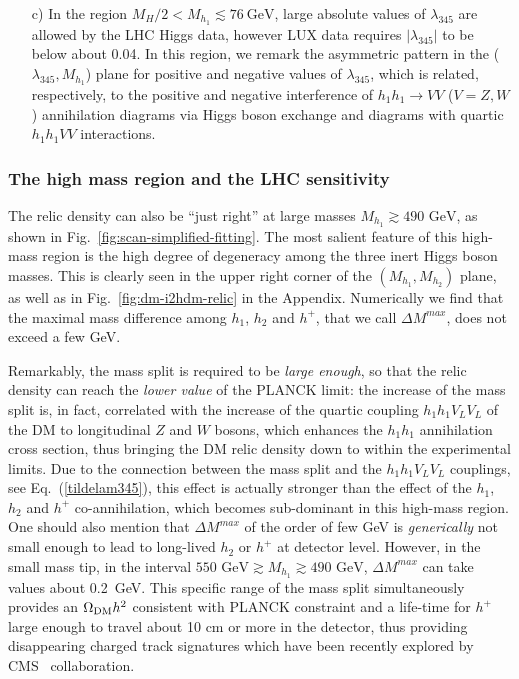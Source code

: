 \documentclass[12pt,a4paper]{article}
\begin{document}
\begin{itemize}
\item[c)] In the region $M_H/2<  M_{h_1} \lesssim 76~\mbox{GeV}$,  
large absolute values of  $\lambda_{345}$ are allowed by the LHC Higgs data, however LUX data requires $|\lambda_{345}|$ to be below about 0.04.
In this region, we remark the asymmetric pattern in the ($\lambda_{345},M_{h_1}$) plane
for positive and negative values of $\lambda_{345}$, which is related, respectively, to the 
positive and negative interference of  $h_1 h_1 \to VV$ ($V=Z,W$) annihilation diagrams via Higgs boson exchange
and diagrams with quartic $h_1 h_1 V V$  interactions. 
\end{itemize}

\subsubsection{The high mass region and the LHC sensitivity}


The relic density can also be ``just right'' at large masses $M_{h_1}\gtrsim 490\mbox{ GeV}$, as shown in Fig.~\ref{fig:scan-simplified-fitting}. 
The most salient feature of this high-mass region is the high degree of degeneracy among the three inert Higgs boson masses.
This is clearly seen in the upper right corner of the $(M_{h_1},M_{h_2})$ plane, as well as in
Fig.~\ref{fig:dm-i2hdm-relic} in the Appendix. Numerically we find that the
maximal mass difference among $h_1$, $h_2$ and $h^+$, that we call $\Delta M^{max}$, does not exceed a few GeV. 

Remarkably, the mass split is required to be {\it large enough}, so that the relic density can reach the {\it lower value} of the PLANCK limit: the increase of  the mass
split is, in fact, correlated with the increase of the quartic coupling $h_1 h_1 V_L V_L$ of the DM to longitudinal $Z$ and $W$ bosons,
which enhances the $h_1 h_1$ annihilation cross section, thus bringing
the DM relic density down to within the experimental limits. Due to the connection between the mass split and the $h_1 h_1 V_L V_L$ couplings, 
see Eq.~(\ref{tildelam345}),
this effect is actually stronger than the effect of the
$h_1$, $h_2$ and $h^+$ co-annihilation, which becomes sub-dominant in this high-mass region.
One should also mention that  $\Delta M^{max}$ of the order of few GeV  is {\it generically} not 
small enough to lead to long-lived $h_2$ or $h^+$ at detector level.
However, in the small mass tip, in the interval
$550\mbox{ GeV} \gtrsim M_{h_1}\gtrsim 490\mbox{ GeV}$,  $\Delta M^{max}$ can take values 
about 0.2~GeV. This specific range of the mass split simultaneously provides an $\Omega_{\rm DM} h^2$ consistent with 
PLANCK constraint and a life-time for $h^+$ large enough to travel  about 10 cm or more in the  detector, thus
providing disappearing charged track signatures which have been recently explored  by  CMS~\cite{CMS:2014gxa}
collaboration.
\end{document}
